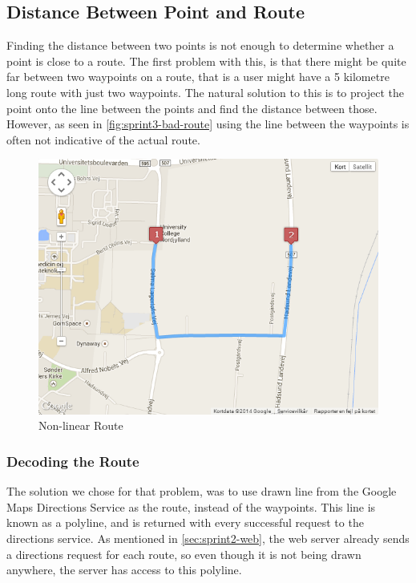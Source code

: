 \subsection{Distance Between Point and Route}

Finding the distance between two points is not enough to determine whether a point is close to a route. The first problem with this, is that there might be quite far between two waypoints on a route, that is a user might have a 5 kilometre long route with just two waypoints. The natural solution to this is to project the point onto the line between the points and find the distance between those. However, as seen in \autoref{fig:sprint3-bad-route} using the line between the waypoints is often not indicative of the actual route.

\begin{figure}[ht]
 \caption{Non-linear Route}
 \label{fig:sprint3-bad-route}
 \includegraphics[scale=0.5]{img/sprint3br.png}
\end{figure}

\subsubsection{Decoding the Route}

The solution we chose for that problem, was to use drawn line from the Google Maps Directions Service as the route, instead of the waypoints. This line is known as a polyline, and is returned with every successful request to the directions service. As mentioned in \autoref{sec:sprint2-web}, the web server already sends a directions request for each route, so even though it is not being drawn anywhere, the server has access to this polyline. 

